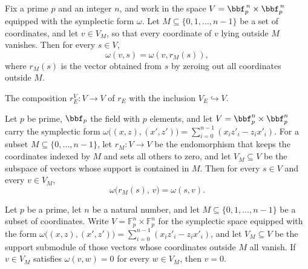 \begin{lemma}
\label{sym_form_r_E}
\leanok
{}
Fix a prime $p$ and an integer $n$, and work in the space $V = \bbf_p^{\,n} \times
\bbf_p^{\,n}$ equipped with the symplectic form $\omega$. Let $M \subseteq \{0, 1,
\dots, n-1\}$ be a set of coordinates, and let $v \in V_M$, so that every coordinate of
$v$ lying outside $M$ vanishes. Then for every $s \in V$,
\[
\omega(v, s) = \omega(v, r_M(s)),
\]
where $r_M(s)$ is the vector obtained from $s$ by zeroing out all coordinates outside
$M$.
\end{lemma}

\begin{definition}
\label{r_E_V}
\leanok
{}
The composition $r_E^V : V \to V$ of $r_E$ with the inclusion $V_E \hookrightarrow V$.
\end{definition}

\begin{lemma}
\label{sym_form_r_E_left}
\leanok
{}
Let $p$ be prime, $\bbf_p$ the field with $p$ elements, and let $V = \bbf_p^n \times
\bbf_p^n$ carry the symplectic form $\omega\big((x,z),(x',z')\big) =
\sum_{i=0}^{n-1}(x_i z'_i - z_i x'_i)$. For a subset $M \subseteq \{0,\dots,n-1\}$, let
$r_M : V \to V$ be the endomorphism that keeps the coordinates indexed by $M$ and sets
all others to zero, and let $V_M \subseteq V$ be the subspace of vectors whose support
is contained in $M$. Then for every $s \in V$ and every $v \in V_M$, \[
\omega\big(r_M(s),\, v\big) = \omega(s, v). \]
\end{lemma}

\begin{lemma}
\label{sym_form_nondegenerate_on_V_sub}
\leanok
{}
Let $p$ be a prime, let $n$ be a natural number, and let $M \subseteq \{0,1,\dots,n-1\}$
be a subset of coordinates. Write $V = \mathbb{F}_p^n \times \mathbb{F}_p^n$ for the
symplectic space equipped with the form $\omega\big((x,z),(x',z')\big) =
\sum_{i=0}^{n-1}(x_i z'_i - z_i x'_i)$, and let $V_M \subseteq V$ be the support
submodule of those vectors whose coordinates outside $M$ all vanish. If $v \in V_M$
satisfies $\omega(v,w) = 0$ for every $w \in V_M$, then $v = 0$.
\end{lemma}

